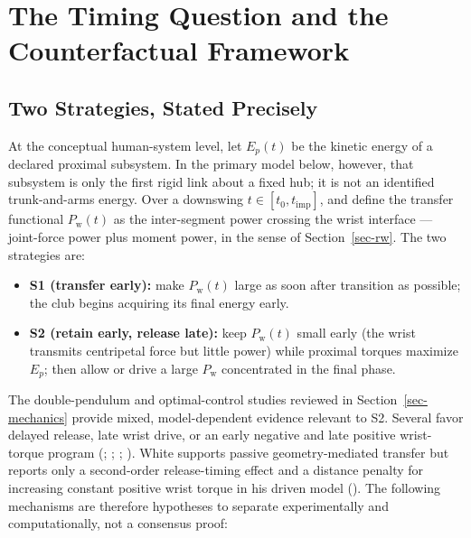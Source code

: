 \documentclass[
  letterpaper,
]{report}
\providecommand{\tightlist}{%
  \setlength{\itemsep}{0pt}\setlength{\parskip}{0pt}}
\begin{document}
\chapter{The Timing Question and the Counterfactual
Framework}\label{sec-timing-framework}

\section{Two Strategies, Stated Precisely}\label{sec-strategies}

At the conceptual human-system level, let \(E_p(t)\) be the kinetic
energy of a declared proximal subsystem. In the primary model below,
however, that subsystem is only the first rigid link about a fixed hub;
it is not an identified trunk-and-arms energy. Over a downswing
\(t \in [t_0, t_{\mathrm{imp}}]\), and define the transfer functional
\(P_{\mathrm{w}}(t)\) as the inter-segment power crossing the wrist
interface --- joint-force power plus moment power, in the sense of
Section~\ref{sec-rw}. The two strategies are:

\begin{itemize}
\tightlist
\item
  \textbf{S1 (transfer early):} make \(P_{\mathrm{w}}(t)\) large as soon
  after transition as possible; the club begins acquiring its final
  energy early.
\item
  \textbf{S2 (retain early, release late):} keep \(P_{\mathrm{w}}(t)\)
  small early (the wrist transmits centripetal force but little power)
  while proximal torques maximize \(E_p\); then allow or drive a large
  \(P_{\mathrm{w}}\) concentrated in the final phase.
\end{itemize}

The double-pendulum and optimal-control studies reviewed in
Section~\ref{sec-mechanics} provide mixed, model-dependent evidence
relevant to S2. Several favor delayed release, late wrist drive, or an
early negative and late positive wrist-torque program
(;
;
;
). White supports passive
geometry-mediated transfer but reports only a second-order
release-timing effect and a distance penalty for increasing constant
positive wrist torque in his driven model
(). The following mechanisms are
therefore hypotheses to separate experimentally and computationally, not
a consensus proof:
\end{document}
